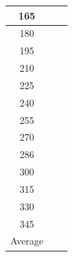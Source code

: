 \documentclass[twocolumn,a4j]{jsarticle}
\begin{document}
\begin{table}[htbp]
\begin{center}
\begin{tabular}{|p{20mm}|p{20mm}|p{20mm}|}
            \multicolumn{1}{|c|}{165}                  & \multicolumn{1}{|r|}{}                     & \multicolumn{1}{|r|}{\textgt{}}            \\ \hline
            \multicolumn{1}{|c|}{180}                  & \multicolumn{1}{|r|}{}                     & \multicolumn{1}{|r|}{\textgt{}}            \\ \hline
            \multicolumn{1}{|c|}{195}                  & \multicolumn{1}{|r|}{}                     & \multicolumn{1}{|r|}{\textgt{}}            \\ \hline
            \multicolumn{1}{|c|}{210}                  & \multicolumn{1}{|r|}{}                     & \multicolumn{1}{|r|}{\textgt{}}            \\ \hline
            \multicolumn{1}{|c|}{225}                  & \multicolumn{1}{|r|}{}                     & \multicolumn{1}{|r|}{\textgt{}}            \\ \hline
            \multicolumn{1}{|c|}{240}                  & \multicolumn{1}{|r|}{}                     & \multicolumn{1}{|r|}{\textgt{}}            \\ \hline
            \multicolumn{1}{|c|}{255}                  & \multicolumn{1}{|r|}{}                     & \multicolumn{1}{|r|}{\textgt{}}            \\ \hline
            \multicolumn{1}{|c|}{270}                  & \multicolumn{1}{|r|}{}                     & \multicolumn{1}{|r|}{\textgt{}}            \\ \hline
            \multicolumn{1}{|c|}{286}                  & \multicolumn{1}{|r|}{}                     & \multicolumn{1}{|r|}{\textgt{}}            \\ \hline
            \multicolumn{1}{|c|}{300}                  & \multicolumn{1}{|r|}{}                     & \multicolumn{1}{|r|}{\textgt{}}            \\ \hline
            \multicolumn{1}{|c|}{315}                  & \multicolumn{1}{|r|}{}                     & \multicolumn{1}{|r|}{\textgt{}}            \\ \hline
            \multicolumn{1}{|c|}{330}                  & \multicolumn{1}{|r|}{}                     & \multicolumn{1}{|r|}{\textgt{}}            \\ \hline
            \multicolumn{1}{|c|}{345}                  & \multicolumn{1}{|r|}{}                     & \multicolumn{1}{|r|}{\textgt{}}            \\ \hline \hline
            \multicolumn{1}{|c|}{Average}              & \multicolumn{1}{|r|}{}                     & \multicolumn{1}{|r|}{\textgt{}}            \\ \hline
        \end{tabular}
    \end{center}
\end{table}
\end{document}
